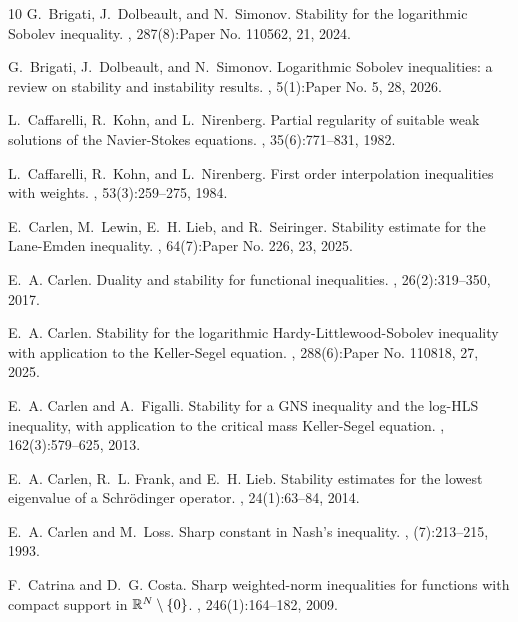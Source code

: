 \documentclass[a4paper,12pt]{article}
\theoremstyle{plain}
\theoremstyle{definition}
\theoremstyle{remark}
\numberwithin{equation}{section}
\begin{document}
\begin{thebibliography}{10}
G.~Brigati, J.~Dolbeault, and N.~Simonov.
\newblock Stability for the logarithmic {S}obolev inequality.
, 287(8):Paper No. 110562, 21, 2024.

G.~Brigati, J.~Dolbeault, and N.~Simonov.
\newblock Logarithmic {S}obolev inequalities: a review on stability and
  instability results.
, 5(1):Paper No. 5, 28, 2026.

L.~Caffarelli, R.~Kohn, and L.~Nirenberg.
\newblock Partial regularity of suitable weak solutions of the
  {N}avier-{S}tokes equations.
, 35(6):771--831, 1982.

L.~Caffarelli, R.~Kohn, and L.~Nirenberg.
\newblock First order interpolation inequalities with weights.
, 53(3):259--275, 1984.

E.~Carlen, M.~Lewin, E.~H. Lieb, and R.~Seiringer.
\newblock Stability estimate for the {L}ane-{E}mden inequality.
, 64(7):Paper No. 226,
  23, 2025.

E.~A. Carlen.
\newblock Duality and stability for functional inequalities.
, 26(2):319--350, 2017.

E.~A. Carlen.
\newblock Stability for the logarithmic {H}ardy-{L}ittlewood-{S}obolev
  inequality with application to the {K}eller-{S}egel equation.
, 288(6):Paper No. 110818, 27, 2025.

E.~A. Carlen and A.~Figalli.
\newblock Stability for a {GNS} inequality and the log-{HLS} inequality, with
  application to the critical mass {K}eller-{S}egel equation.
, 162(3):579--625, 2013.

E.~A. Carlen, R.~L. Frank, and E.~H. Lieb.
\newblock Stability estimates for the lowest eigenvalue of a {S}chr\"odinger
  operator.
, 24(1):63--84, 2014.

E.~A. Carlen and M.~Loss.
\newblock Sharp constant in {N}ash's inequality.
, (7):213--215, 1993.

F.~Catrina and D.~G. Costa.
\newblock Sharp weighted-norm inequalities for functions with compact support
  in {$\Bbb R^N\setminus\{0\}$}.
, 246(1):164--182, 2009.


\end{thebibliography}
\end{document}

